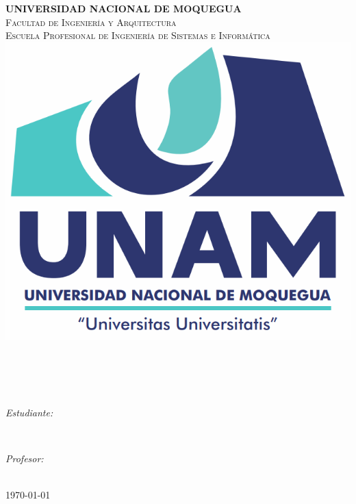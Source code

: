 \begin{titlepage}
\newcommand{\HRule}{\rule{\linewidth}{0.5mm}}
\centering

\textsc{\Large \textbf{UNIVERSIDAD NACIONAL DE MOQUEGUA}}\\[0.5cm]
\textsc{\Large Facultad de Ingeniería y Arquitectura }\\[0.5cm]
\textsc{\large Escuela Profesional de Ingeniería de Sistemas e Informática}\\[1.5cm]

\includegraphics[scale=.25]{img/image.png}\\[0.2cm] 


\noindent\hrulefill \\[0.5cm]
{ 
\Large{\bfseries{\reporttitle}}\\[0.5cm]
\large{\bfseries{\reportname}}
}\\[0.4cm]
\noindent\hrulefill \\[0.5cm]



\begin{minipage}[t]{0.4\textwidth}
\begin{flushleft} \large
\emph{Estudiante:}\\
\studentname
\end{flushleft}
\end{minipage}
~
\begin{minipage}[t]{0.4\textwidth}
\begin{flushright} \large
\emph{Profesor:} \\
\teachername
\end{flushright}
\end{minipage}\\[2cm]

{\large \today}\\[2cm]



\vfill
\end{titlepage}
	